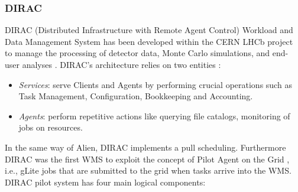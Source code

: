 


\subsubsection{DIRAC}

DIRAC (Distributed Infrastructure with Remote Agent Control) Workload and Data
Management System has been developed within the CERN LHCb project to manage the
processing of detector data, Monte Carlo simulations, and end-user analyses
\cite{Tsaregorodtsev2004}. DIRAC's architecture relies on two entities
\cite{Paterson2010}:

\begin{itemize}
    \item \emph{Services}: serve Clients and Agents by performing crucial
    operations such as Task Management, Configuration, Bookkeeping and
    Accounting.
    \item \emph{Agents}: perform repetitive actions like querying file
    catalogs, monitoring of jobs on resources.
\end{itemize}

In the same way of Alien, DIRAC implements a pull scheduling. Furthermore DIRAC
was the first WMS to exploit the concept of Pilot Agent on the Grid
\cite{Casajus2010}, i.e., gLite jobs that are submitted to the grid when tasks
arrive into the WMS. DIRAC pilot system has four main logical components:

